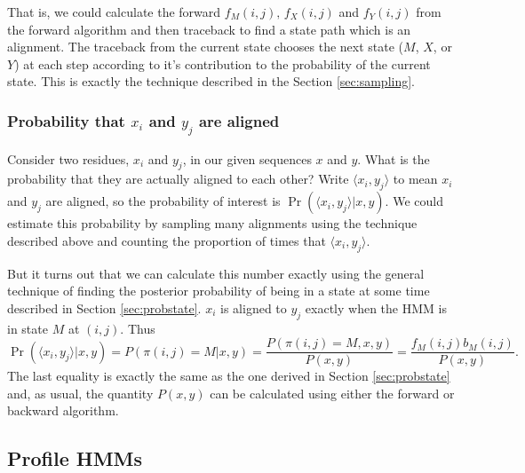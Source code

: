 \documentclass[11pt]{article}
\begin{document}
That is, we could calculate the forward $f_M(i,j), \, f_X(i,j)$ and $f_Y(i,j)$ from the forward algorithm and then traceback to find a state path which is an alignment.  The traceback from the current state chooses the next state ($M$, $X$, or $Y$) at each step according to it's contribution to the probability of the current state.    This is exactly the technique described in the Section \ref{sec:sampling}.

\subsubsection{Probability that $x_i$ and $y_j$ are aligned}

Consider two residues,  $x_i$ and $y_j$, in our given sequences $x$ and $y$. What is the probability that they are actually aligned to each other?  Write $\langle x_i,y_j \rangle$ to mean $x_i$ and $y_j$ are aligned, so the probability of interest is $\Pr(\langle x_i,y_j \rangle | x,y)$.  We could estimate this probability by sampling many alignments using the technique described above  and counting the proportion of times that $\langle x_i,y_j \rangle$.  

But it turns out that we can calculate this number exactly using the general technique of finding the posterior probability of being in  a state at some time described in Section \ref{sec:probstate}.  $x_i$ is aligned to $y_j$ exactly when the HMM is in state $M$ at $(i,j)$.  Thus
\[ \Pr(\langle x_i,y_j \rangle | x,y) = P(\pi(i,j)  = M|x,y) = \frac{ P(\pi(i,j)  = M,x,y)}{P(x,y)} = \frac{f_M(i,j)b_M(i,j)}{P(x,y)}. \] 
The last equality is exactly the same as the one derived in Section \ref{sec:probstate} and, as usual, the quantity $P(x,y)$ can be calculated using either the forward or backward algorithm.  







 
 
\subsection{Profile HMMs}

\end{document}
